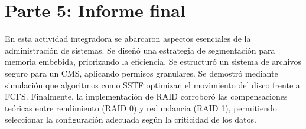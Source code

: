\documentclass[stu, 12pt, letterpaper, donotrepeattitle, floatsintext, noapacite]{apa7}
\begin{document}
\section{Parte 5: Informe final}
En esta actividad integradora se abarcaron aspectos esenciales de la administración de sistemas. Se diseñó una estrategia de segmentación para memoria embebida, priorizando la eficiencia. Se estructuró un sistema de archivos seguro para un CMS, aplicando permisos granulares. Se demostró mediante simulación que algoritmos como SSTF optimizan el movimiento del disco frente a FCFS. Finalmente, la implementación de RAID corroboró las compensaciones teóricas entre rendimiento (RAID 0) y redundancia (RAID 1), permitiendo seleccionar la configuración adecuada según la criticidad de los datos.

\newpage

\printbibliography[title={Referencias}]
\end{document}
